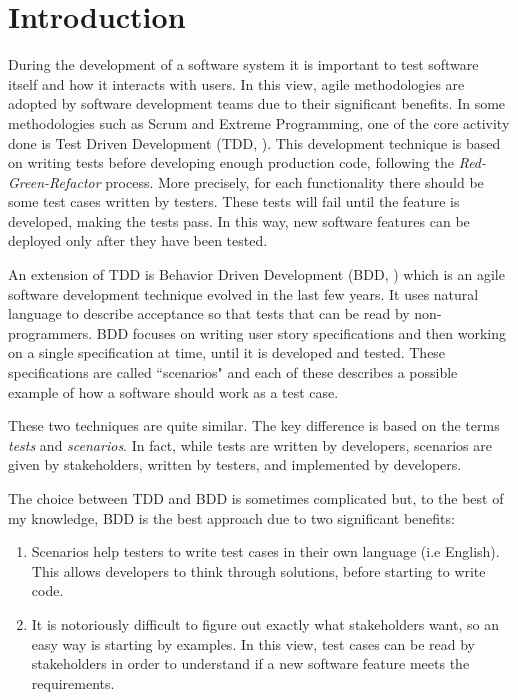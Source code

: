 \chapter{Introduction}

During the development of a software system it is important to test software itself and how it interacts with users. In this view, agile methodologies are adopted by software development teams due to their significant benefits. In some methodologies such as Scrum and Extreme Programming, one of the core activity done is Test Driven Development (TDD, \cite{book:tdd}). This development technique is based on writing tests before developing enough production code, following the \textit{Red-Green-Refactor} process. More precisely, for each functionality there should be some test cases written by testers. These tests will fail until the feature is developed, making the tests pass. In this way, new software features can be deployed only after they have been tested.

An extension of TDD is Behavior Driven Development (BDD, \cite{article:bdd}) which is an agile software development technique evolved in the last few years. It uses natural language to describe acceptance so that tests that can be read by non-programmers. BDD focuses on writing user story specifications and then working on a single specification at time, until it is developed and tested. These specifications are called ``scenarios" and each of these describes a possible example of how a software should work as a test case.

These two techniques are quite similar. The key difference is based on the terms \textit{tests} and \textit{scenarios}. In fact, while tests are written by developers, scenarios are given by stakeholders, written by testers, and implemented by developers.

The choice between TDD and BDD is sometimes complicated \cite{article:skygate} but, to the best of my knowledge, BDD is the best approach due to two significant benefits:

\begin{enumerate}
\item Scenarios help testers to write test cases in their own language (i.e English). This allows developers to think through solutions, before starting to write code.
\newpage
\item It is notoriously difficult to figure out exactly what stakeholders want, so an easy way is starting by examples. In this view, test cases can be read by stakeholders in order to understand if a new software feature meets the requirements.
\end{enumerate}

